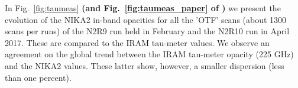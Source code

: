 In Fig.~\ref{fig:taumeas} {\bf(and Fig.~\ref{fig:taumeas_paper} of
  \cite{Adam18}) } we present the evolution of the NIKA2 in-band
opacities for all the 'OTF' scans (about 1300 scans per runs) of the
N2R9 run held in February and the N2R10 run in April 2017. These are
compared to the IRAM tau-meter values. We observe an agreement on the global trend between the IRAM tau-meter opacity (225 GHz) and the NIKA2 values. These latter show, however,
a smaller dispersion (less than one percent).


